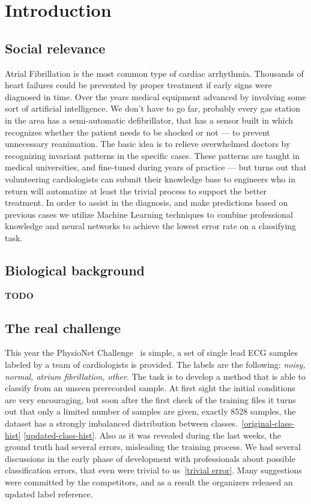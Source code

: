 \chapter{Introduction}


\section{Social relevance}
Atrial Fibrillation is the most common type of cardiac arrhythmia.
Thousands of heart failures could be prevented by proper treatment if early signs were diagnosed in time.
Over the years medical equipment advanced by involving some sort of artificial intelligence.
We don't have to go far, probably every gas station in the area has a semi-automatic defibrillator, that has a sensor built in which recognizes whether the patient needs to be shocked or not --- to prevent unnecessary reanimation.
The basic idea is to relieve overwhelmed doctors by recognizing invariant patterns in the specific cases.
These patterns are taught in medical universities, and fine-tuned during years of practice --- but turns out that volunteering cardiologists can submit their knowledge base to engineers who in return will automatize at least the trivial process to support the better treatment.
In order to assist in the diagnosis, and make predictions based on previous cases we utilize Machine Learning techniques to combine professional knowledge and neural networks to achieve the lowest error rate on a classifying task.

\section{Biological background}
\textbf{TODO}

\section{The real challenge}
This year the PhysioNet Challenge~\cite{physionet} is simple, a set of single lead ECG samples labeled by a team of cardiologists is provided. The labels are the following: \textit{noisy, normal, atrium fibrillation, other}. The task is to develop a method that is able to classify from an unseen prerecorded sample.
At first sight the initial conditions are very encouraging, but soon after the first check of the training files it turns out that only a limited number of samples are given, exactly 8528 samples, the dataset has a strongly imbalanced distribution between classes.~\ref{original-class-hist}
\ref{updated-class-hist}.
Also as it was revealed during the last weeks, the ground truth had several errors, misleading the training process.
We had several discussions in the early phase of development with professionals about possible classification errors, that even were trivial to us~\ref{trivial error}. Many suggestions were committed by the competitors, and as a result the organizers released an updated label reference.
